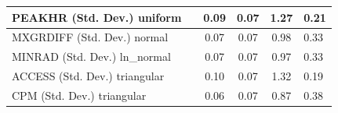 \begin{table}
\begin{center}
\begin{tabular}{|l|l|c|c|c|l|}
			\hline
			PEAKHR (Std. Dev.) uniform &  & 0.09 & 0.07 & 1.27 & 0.21 \\
			\hline
			MXGRDIFF (Std. Dev.) normal &  & 0.07 & 0.07 & 0.98 & 0.33 \\
			\hline
			MINRAD (Std. Dev.) ln_normal &  & 0.07 & 0.07 & 0.97 & 0.33 \\
			\hline
			ACCESS (Std. Dev.) triangular &  & 0.10 & 0.07 & 1.32 & 0.19 \\
			\hline
			CPM (Std. Dev.) triangular &  & 0.06 & 0.07 & 0.87 & 0.38 \\
			\hline
		\end{tabular}
	\end{center}
\end{table}